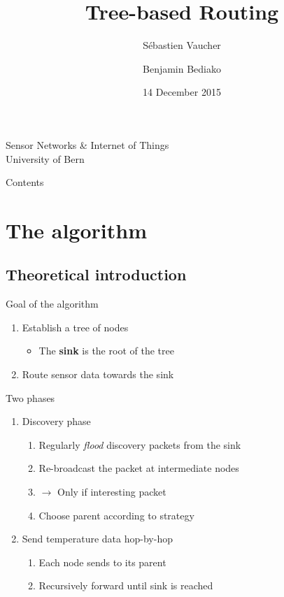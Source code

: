 \documentclass[14pt,aspectratio=169,xcolor={usenames,dvipsnames}]{beamer}
\author{Sébastien Vaucher \and Benjamin Bediako}
\title{Tree-based Routing}
\date{14 December 2015}
\begin{document}
\begin{frame}[plain]
\titlepage
\begin{center}
Sensor Networks \& Internet of Things\\
University of Bern
\end{center}
\end{frame}

\begin{frame}{Contents}
\tableofcontents
\end{frame}



\section{The algorithm}

\subsection{Theoretical introduction}

\begin{frame}{Goal of the algorithm}

\begin{enumerate}
\item Establish a tree of nodes
\begin{itemize}
\item The \textbf{sink} is the root of the tree
\end{itemize}
\item Route sensor data towards the sink
\end{enumerate}
\end{frame}


\begin{frame}{Two phases}
\begin{enumerate}
\item Discovery phase
\begin{enumerate}
\item Regularly \textit{flood} discovery packets from the sink
\item Re-broadcast the packet at intermediate nodes
\item $\rightarrow$ Only if interesting packet
\item Choose parent according to strategy
\end{enumerate}
\item Send temperature data hop-by-hop
\begin{enumerate}
\item Each node sends to its parent
\item Recursively forward until sink is reached
\end{enumerate}
\end{enumerate}
\end{frame}
\end{document}
